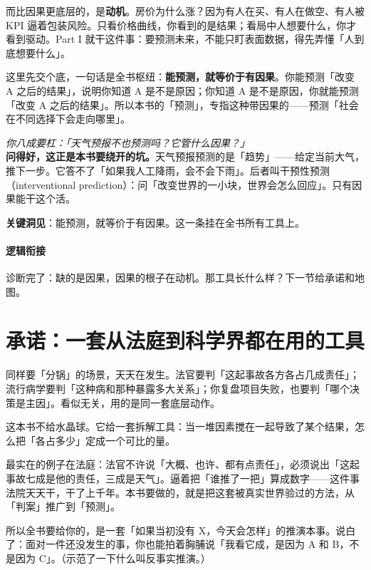 \documentclass[../../main2.tex]{subfiles}
\begin{document}
而比因果更底层的，是\textbf{动机}。房价为什么涨？因为有人在买、有人在做空、有人被 KPI 逼着包装风险。只看价格曲线，你看到的是结果；看局中人想要什么，你才看到驱动。Part I 就干这件事：要预测未来，不能只盯表面数据，得先弄懂「人到底想要什么」。

这里先交个底，一句话是全书枢纽：\textbf{能预测，就等价于有因果}。你能预测「改变 A 之后的结果」，说明你知道 A 是不是原因；你知道 A 是不是原因，你就能预测「改变 A 之后的结果」。所以本书的「预测」，专指这种带因果的——预测「社会在不同选择下会走向哪里」。

\begin{questionbox}
	\textit{你八成要杠：「天气预报不也预测吗？它管什么因果？」}\\
	\textbf{问得好，这正是本书要绕开的坑。}天气预报预测的是「趋势」——给定当前大气，推下一步。它答不了「如果我人工降雨，会不会下雨」。后者叫干预性预测（interventional prediction）：问「改变世界的一小块，世界会怎么回应」。只有因果能干这个活。
\end{questionbox}

\textbf{\Large 关键洞见}：能预测，就等价于有因果。这一条挂在全书所有工具上。

\paragraph*{逻辑衔接}
	诊断完了：缺的是因果，因果的根子在动机。那工具长什么样？下一节给承诺和地图。

\section{承诺：一套从法庭到科学界都在用的工具}

同样要「分锅」的场景，天天在发生。法官要判「这起事故各方各占几成责任」；流行病学要判「这种病和那种暴露多大关系」；你复盘项目失败，也要判「哪个决策是主因」。看似无关，用的是同一套底层动作。

这本书不给水晶球。它给一套拆解工具：当一堆因素搅在一起导致了某个结果，怎么把「各占多少」定成一个可比的量。

\begin{tcolorbox}[colback=green!5, title=\textit{生活类比}]
	最实在的例子在法庭：法官不许说「大概、也许、都有点责任」，必须说出「这起事故七成是他的责任，三成是天气」。逼着把「谁推了一把」算成数字——这件事法院天天干，干了上千年。本书要做的，就是把这套被真实世界验过的方法，从「判案」推广到「预测」。
\end{tcolorbox}

所以全书要给你的，是一套「如果当初没有 X，今天会怎样」的推演本事。说白了：面对一件还没发生的事，你也能拍着胸脯说「我看它成，是因为 A 和 B，不是因为 C」。（示范了一下什么叫反事实推演。）
\end{document}
